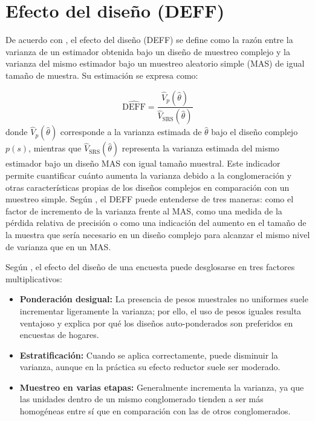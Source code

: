 \documentclass[
  spanish,
  12pt,
]{book}
\providecommand{\tightlist}{%
  \setlength{\itemsep}{0pt}\setlength{\parskip}{0pt}}
\begin{document}
\section{Efecto del diseño (DEFF)}\label{efecto-del-diseuxf1o-deff}

De acuerdo con \citet[p.~258]{kish1965survey}, el efecto del diseño (DEFF) se define como la razón entre la varianza de un estimador obtenida bajo un diseño de muestreo complejo y la varianza del mismo estimador bajo un muestreo aleatorio simple (MAS) de igual tamaño de muestra. Su estimación se expresa como:

\[\widehat{\text{DEFF}} = \frac{\widehat{V}_{p}(\hat{\theta})}{\widehat{V}_{\text{SRS}}(\hat{\theta})}\]
donde
\(\widehat{V}_{p}(\hat{\theta})\) corresponde a la varianza estimada de \(\hat{\theta}\) bajo el diseño complejo \(p(s)\), mientras que \(\widehat{V}_{\text{SRS}}(\hat{\theta})\)
representa la varianza estimada del mismo estimador bajo un diseño MAS con igual tamaño muestral. Este indicador permite cuantificar cuánto aumenta la varianza debido a la conglomeración y otras características propias de los diseños complejos en comparación con un muestreo simple. Según \citet[p.~40]{ONUDeff}, el DEFF puede entenderse de tres maneras: como el factor de incremento de la varianza frente al MAS, como una medida de la pérdida relativa de precisión o como una indicación del aumento en el tamaño de la muestra que sería necesario en un diseño complejo para alcanzar el mismo nivel de varianza que en un MAS.

Según \citet{Park2003Design}, el efecto del diseño de una encuesta puede desglosarse en tres factores multiplicativos:

\begin{itemize}
\tightlist
\item
  \textbf{Ponderación desigual:} La presencia de pesos muestrales no uniformes suele incrementar ligeramente la varianza; por ello, el uso de pesos iguales resulta ventajoso y explica por qué los diseños auto-ponderados son preferidos en encuestas de hogares.
\item
  \textbf{Estratificación:} Cuando se aplica correctamente, puede disminuir la varianza, aunque en la práctica su efecto reductor suele ser moderado.
\item
  \textbf{Muestreo en varias etapas:} Generalmente incrementa la varianza, ya que las unidades dentro de un mismo conglomerado tienden a ser más homogéneas entre sí que en comparación con las de otros conglomerados.
\end{itemize}
\end{document}

